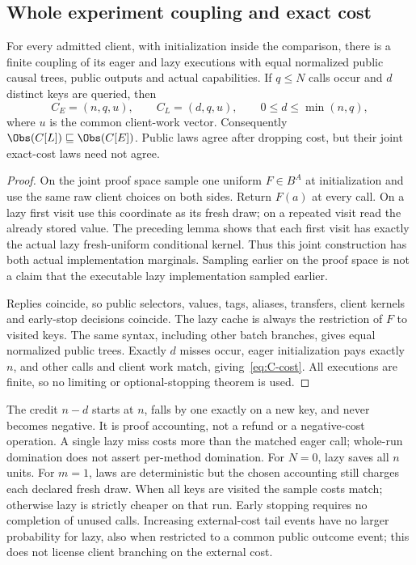 \subsection{Whole experiment coupling and exact cost}\label{sec:C-theorem}
\begin{theorem}
For every admitted client, with initialization inside the comparison,
there is a finite coupling of its eager and lazy executions with equal
normalized public causal trees, public outputs and actual capabilities.
If $q\leq N$ calls occur and $d$ distinct keys are queried, then
\begin{equation}\label{eq:C-cost}
C_E=(n,q,u),\qquad C_L=(d,q,u),\qquad
0\leq d\leq\min(n,q),
\end{equation}
where $u$ is the common client-work vector. Consequently
$\Obs(C[L])\sqsubseteq\Obs(C[E])$. Public laws agree after dropping
cost, but their joint exact-cost laws need not agree.
\end{theorem}
\begin{proof}
On the joint proof space sample one uniform $F\in B^A$ at initialization
and use the same raw client choices on both sides. Return $F(a)$ at
every call. On a lazy first visit use this coordinate as its fresh draw;
on a repeated visit read the already stored value. The preceding lemma
shows that each first visit has exactly the actual lazy fresh-uniform
conditional kernel. Thus this joint construction has both actual
implementation marginals. Sampling earlier on the proof space is not a
claim that the executable lazy implementation sampled earlier.

Replies coincide, so public selectors, values, tags, aliases, transfers,
client kernels and early-stop decisions coincide. The lazy cache is
always the restriction of $F$ to visited keys. The same syntax, including
other batch branches, gives equal normalized public trees. Exactly $d$
misses occur, eager initialization pays exactly $n$, and other calls and
client work match, giving~\eqref{eq:C-cost}. All executions are finite,
so no limiting or optional-stopping theorem is used.
\end{proof}
The credit $n-d$ starts at $n$, falls by one exactly on a new key, and
never becomes negative. It is proof accounting, not a refund or a
negative-cost operation. A single lazy miss costs more than the matched
eager call; whole-run domination does not assert per-method domination.
For $N=0$, lazy saves all $n$ units. For $m=1$, laws are deterministic
but the chosen accounting still charges each declared fresh draw. When
all keys are visited the sample costs match; otherwise lazy is strictly
cheaper on that run. Early stopping requires no completion of unused
calls. Increasing external-cost tail events have no larger probability
for lazy, also when restricted to a common public outcome event; this
does not license client branching on the external cost.

